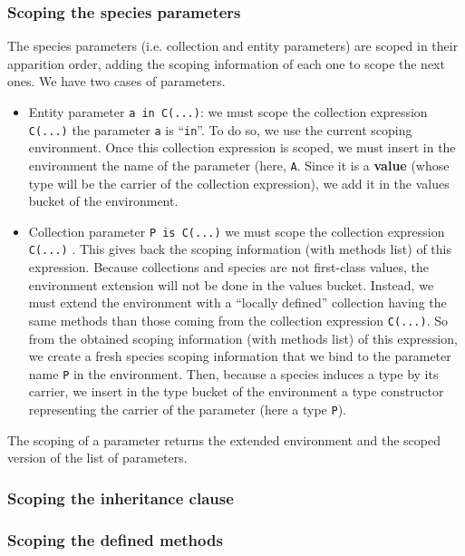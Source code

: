 \subsubsection{Scoping the species parameters}
The species parameters (i.e. collection and entity parameters) are
scoped in their apparition order, adding the scoping information of
each one to scope the next ones. We have two cases of parameters.
\begin{itemize}
\item Entity parameter {\tt a in C(...)}: we must scope the collection
  expression {\tt C(...)} the parameter {\tt a} is ``{\tt in}''. To
  do so, we use the current scoping environment. Once this collection
  expression is scoped, we must insert in the environment the name of
  the parameter (here, {\tt A}. Since it is a {\bf value} (whose type
  will be the carrier of the collection expression), we add it in the
  values bucket of the environment.
\item Collection parameter {\tt P is C(...)} we must scope the
  collection expression {\tt C(...)} . This gives back the scoping
  information (with methods list) of this expression. Because
  collections and species are not first-class values, the environment
  extension will not be done in the values bucket. Instead, we must
  extend the environment with a ``locally defined'' collection having
  the same methods than those coming from the collection expression
  {\tt C(...)}. So from the obtained scoping information (with methods
  list) of this expression, we create a fresh species scoping
  information that we bind to the parameter name {\tt P} in the
  environment. Then, because a species induces a type by its carrier,
  we insert in the type bucket of the environment a type constructor
  representing the carrier of the parameter (here a type {\tt P}).
\end{itemize}
The scoping of a parameter returns the extended environment and the
scoped version of the list of parameters.


\subsubsection{Scoping the inheritance clause}

\subsubsection{Scoping the defined methods}




